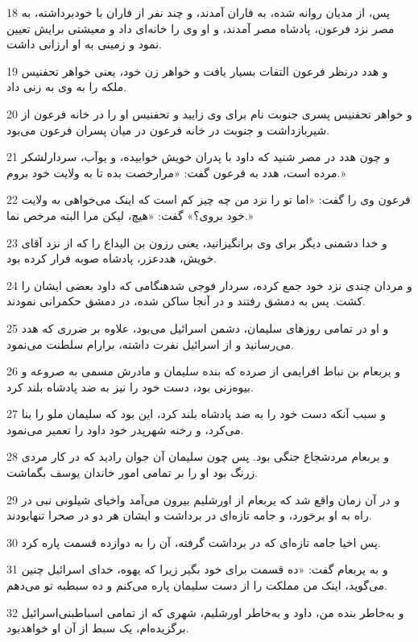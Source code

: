 \par 18 پس، از مدیان روانه شده، به فاران آمدند، و چند نفر از فاران با خودبرداشته، به مصر نزد فرعون، پادشاه مصر آمدند، و او وی را خانه‌ای داد و معیشتی برایش تعیین نمود و زمینی به او ارزانی داشت.
\par 19 و هدد درنظر فرعون التفات بسیار یافت و خواهر زن خود، یعنی خواهر تحفنیس ملکه را به وی به زنی داد.
\par 20 و خواهر تحفنیس پسری جنوبت نام برای وی زایید و تحفنیس او را در خانه فرعون از شیربازداشت و جنوبت در خانه فرعون در میان پسران فرعون می‌بود.
\par 21 و چون هدد در مصر شنید که داود با پدران خویش خوابیده، و یوآب، سردارلشکر مرده است، هدد به فرعون گفت: «مرارخصت بده تا به ولایت خود بروم.»
\par 22 فرعون وی را گفت: «اما تو را نزد من چه چیز کم است که اینک می‌خواهی به ولایت خود بروی؟» گفت: «هیچ، لیکن مرا البته مرخص نما.»
\par 23 و خدا دشمنی دیگر برای وی برانگیزانید، یعنی رزون بن الیداع را که از نزد آقای خویش، هددعزر، پادشاه صوبه فرار کرده بود.
\par 24 و مردان چندی نزد خود جمع کرده، سردار فوجی شدهنگامی که داود بعضی ایشان را کشت. پس به دمشق رفتند و در آنجا ساکن شده، در دمشق حکمرانی نمودند.
\par 25 و او در تمامی روزهای سلیمان، دشمن اسرائیل می‌بود، علاوه بر ضرری که هدد می‌رسانید و از اسرائیل نفرت داشته، برارام سلطنت می‌نمود.
\par 26 و یربعام بن نباط افرایمی از صرده که بنده سلیمان و مادرش مسمی به صروعه و بیوه‌زنی بود، دست خود را نیز به ضد پادشاه بلند کرد.
\par 27 و سبب آنکه دست خود را به ضد پادشاه بلند کرد، این بود که سلیمان ملو را بنا می‌کرد، و رخنه شهرپدر خود داود را تعمیر می‌نمود.
\par 28 و یربعام مردشجاع جنگی بود. پس چون سلیمان آن جوان رادید که در کار مردی زرنگ بود او را بر تمامی امور خاندان یوسف بگماشت.
\par 29 و در آن زمان واقع شد که یربعام از اورشلیم بیرون می‌آمد واخیای شیلونی نبی در راه به او برخورد، و جامه تازه‌ای در برداشت و ایشان هر دو در صحرا تنهابودند.
\par 30 پس اخیا جامه تازه‌ای که در برداشت گرفته، آن را به دوازده قسمت پاره کرد.
\par 31 و به یربعام گفت: «ده قسمت برای خود بگیر زیرا که یهوه، خدای اسرائیل چنین می‌گوید، اینک من مملکت را از دست سلیمان پاره می‌کنم و ده سبطبه تو می‌دهم.
\par 32 و به‌خاطر بنده من، داود و به‌خاطر اورشلیم، شهری که از تمامی اسباطبنی‌اسرائیل برگزیده‌ام، یک سبط از آن او خواهدبود.
